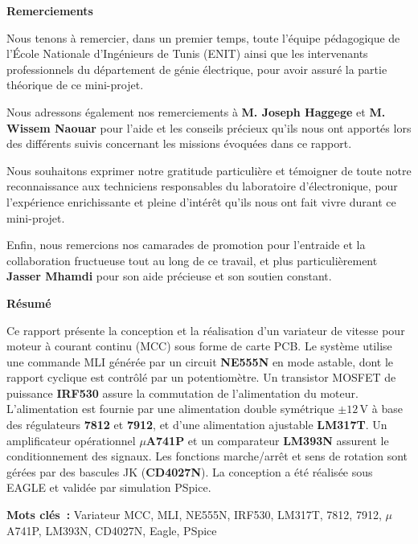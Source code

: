 \documentclass[a4paper,12pt,openany]{book}
\begin{document}
\newpage
\thispagestyle{empty}
\centerline{\Large \textbf{Remerciements}}
\vspace{2\baselineskip}

Nous tenons \`a remercier, dans un premier temps, toute l'\'equipe
p\'edagogique de l'\'Ecole Nationale d'Ing\'enieurs de Tunis (ENIT) ainsi
que les intervenants professionnels du d\'epartement de g\'enie
\'electrique, pour avoir assur\'e la partie th\'eorique de ce mini-projet.

Nous adressons \'egalement nos remerciements \`a \textbf{M. Joseph Haggege}
et \textbf{M. Wissem Naouar} pour l'aide et les conseils pr\'ecieux qu'ils
nous ont apport\'es lors des diff\'erents suivis concernant les missions
\'evoqu\'ees dans ce rapport.

Nous souhaitons exprimer notre gratitude particuli\`ere et t\'emoigner de
toute notre reconnaissance aux techniciens responsables du laboratoire
d'\'electronique, pour l'exp\'erience enrichissante et pleine d'int\'er\^et
qu'ils nous ont fait vivre durant ce mini-projet.

Enfin, nous remercions nos camarades de promotion pour l'entraide et la
collaboration fructueuse tout au long de ce travail, et plus
particuli\`erement \textbf{Jasser Mhamdi} pour son aide pr\'ecieuse et
son soutien constant.

\newpage
\thispagestyle{empty}
\centerline{\Large \textbf{R\'esum\'e}}
\vspace{\baselineskip}

Ce rapport pr\'esente la conception et la r\'ealisation d'un variateur de
vitesse pour moteur \`a courant continu (MCC) sous forme de carte PCB.
Le syst\`eme utilise une commande MLI g\'en\'er\'ee par un circuit
\textbf{NE555N} en mode astable, dont le rapport cyclique est contr\^ol\'e
par un potentiom\`etre. Un transistor MOSFET de puissance \textbf{IRF530}
assure la commutation de l'alimentation du moteur. L'alimentation est
fournie par une alimentation double sym\'etrique $\pm12$\,V \`a base des
r\'egulateurs \textbf{7812} et \textbf{7912}, et d'une alimentation
ajustable \textbf{LM317T}. Un amplificateur op\'erationnel \textbf{$\mu$A741P}
et un comparateur \textbf{LM393N} assurent le conditionnement des signaux.
Les fonctions marche/arr\^et et sens de rotation sont g\'er\'ees par des
bascules JK (\textbf{CD4027N}). La conception a \'et\'e r\'ealis\'ee sous
EAGLE et valid\'ee par simulation PSpice.

\noindent \textbf{Mots cl\'es~:} Variateur MCC, MLI, NE555N, IRF530,
LM317T, 7812, 7912, $\mu$A741P, LM393N, CD4027N, Eagle, PSpice
\end{document}
